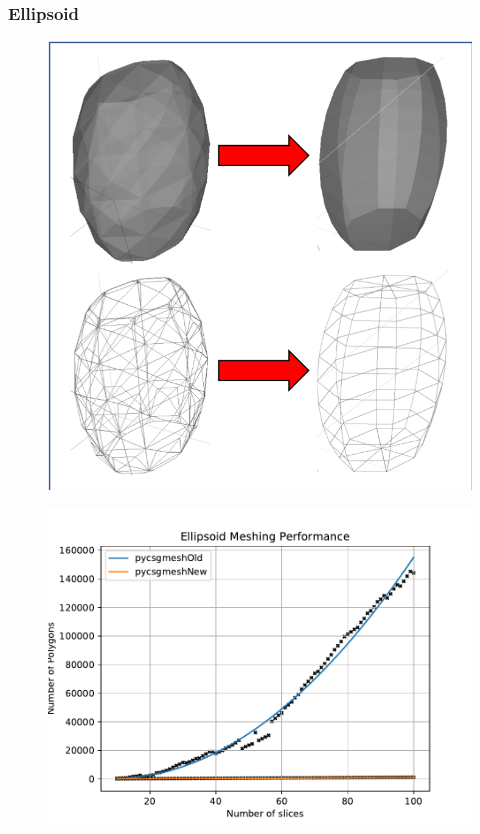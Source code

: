 \documentclass[12pt,a4paper]{article}
\begin{document}
\subsubsection{Ellipsoid}

\begin{figure}[h!]
\centering
\begin{minipage}{.2\textwidth}
  \centering
  \includegraphics[height=1\linewidth]{Images//Meshes//ellipsoid.png}
  \label{fig:test1}
\end{minipage}%
\begin{minipage}{.3\textwidth}
  \centering
  \includegraphics[scale=0.35]{Images//Quad_fits//Ellipsoid_quad.pdf}
  \label{fig:test2}
\end{minipage}%
\end{figure}
\end{document}
